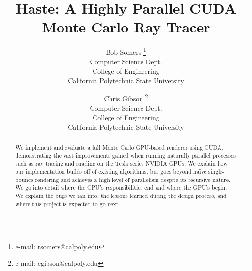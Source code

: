 \documentclass{acmsiggraph}                     %
\title{Haste: A Highly Parallel CUDA Monte Carlo Ray Tracer}
\author{Bob Somers \thanks{e-mail: rsomers@calpoly.edu} \\ Computer Science Dept. \\ College of Engineering \\ California Polytechnic State University %
\and Chris Gibson \thanks{e-mail: cgibson@calpoly.edu} \\ Computer Science Dept. \\ College of Engineering \\ California Polytechnic State University}
\begin{document}


\maketitle


\begin{abstract}

We implement and evaluate a full Monte Carlo GPU-based renderer using CUDA, demonstrating the vast
improvements gained when running naturally parallel processes such as ray tracing and shading on
the Tesla series NVIDIA GPUs. We explain how our implementation builds off of existing algorithms,
but goes beyond na\"{i}ve single-bounce rendering and achieves a high level of parallelism despite
its recursive nature. We go into detail where the CPU's responsibilities end and where
the GPU's begin. We explain the bugs we ran into, the lessons learned during the design process,
and where this project is expected to go next.

\end{abstract}
\end{document}
